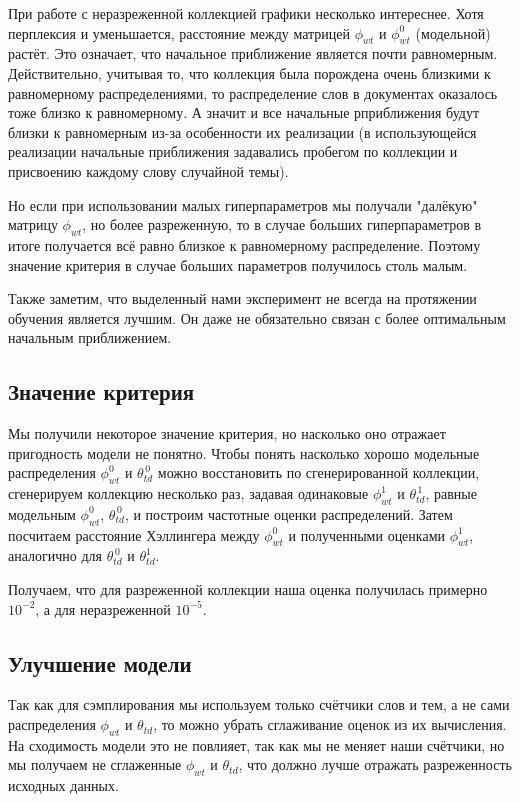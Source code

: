 \documentclass[12pt]{article}
\begin{document}
При работе с неразреженной коллекцией графики несколько интереснее.
Хотя перплексия и уменьшается, расстояние между матрицей $ \phi_{wt} $ и $ \phi_{wt}^0 $ (модельной) растёт.
Это означает, что начальное приближение является почти равномерным.
Действительно, учитывая то, что коллекция была порождена очень близкими к равномерному распределениями, то распределение слов в документах оказалось тоже близко к равномерному.
А значит и все начальные рприближения будут близки к равномерным из-за особенности их реализации (в использующейся реализации начальные приближения задавались пробегом по коллекции и присвоению каждому слову случайной темы).

Но если при использовании малых гиперпараметров мы получали "далёкую" матрицу $ \phi_{wt} $, но более разреженную, то в случае больших гиперпараметров в итоге получается всё равно близкое к равномерному распределение.
Поэтому значение критерия в случае больших параметров получилось столь малым.

Также заметим, что выделенный нами эксперимент не всегда на протяжении обучения является лучшим.
Он даже не обязательно связан с более оптимальным начальным приближением.

\subsection{Значение критерия}

Мы получили некоторое значение критерия, но насколько оно отражает пригодность модели не понятно.
Чтобы понять насколько хорошо модельные распределения $ \phi_{wt}^0 $ и $ \theta_{td}^{\,0} $ можно восстановить по сгенерированной коллекции, сгенерируем коллекцию несколько раз, задавая одинаковые $ \phi_{wt}^1 $ и $ \theta_{td}^{\,1} $, равные модельным $ \phi_{wt}^0 $, $ \theta_{td}^{\,0} $, и построим частотные оценки распределений.
Затем посчитаем расстояние Хэллингера между $ \phi_{wt}^0 $ и полученными оценками $ \phi_{wt}^1 $, аналогично для $ \theta_{td}^{\,0} $ и $ \theta_{td}^1 $.

Получаем, что для разреженной коллекции наша оценка получилась примерно $ 10^{-2} $, а для неразреженной $ 10^{-5} $.

\subsection{Улучшение модели}

Так как для сэмплирования мы используем только счётчики слов и тем, а не сами распределения $ \phi_{wt} $ и $ \theta_{td} $, то можно убрать сглаживание оценок из их вычисления.
На сходимость модели это не повлияет, так как мы не меняет наши счётчики, но мы получаем не сглаженные $ \phi_{wt} $ и $ \theta_{td} $, что должно лучше отражать разреженность исходных данных.
\end{document}

